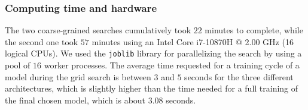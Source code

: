 \begin{table}[htb]
    \centering
    \caption{Hyperparameters and average training, validation and test error of the 8 most performant configurations after last grid search}
    \label{table:grid_search_results}
\end{table}

\subsubsection{Computing time and hardware}
The two coarse-grained searches cumulatively took $22$ minutes to complete, while the second one took $57$ minutes using an Intel Core i7-10870H @ 2.00 GHz (16 logical CPUs). We used the \texttt{joblib} library for parallelizing the search by using a pool of $16$ worker processes. The average time requested for a training cycle of a model during the grid search is between $3$ and $5$ seconds for the three different architectures, which is slightly higher than the time needed for a full training of the final chosen model, which is about $3.08$ seconds.

